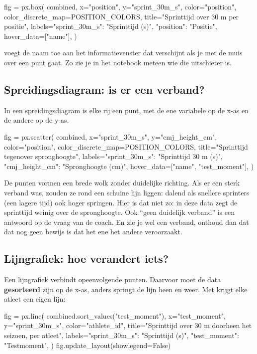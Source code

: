 \documentclass[11pt,a4paper]{article}
\begin{document}
\begin{python}[fig=boxplot]
fig = px.box(
    combined, x="position", y="sprint_30m_s",
    color="position", color_discrete_map=POSITION_COLORS,
    title="Sprinttijd over 30 m per positie",
    labels={"sprint_30m_s": "Sprinttijd (s)", "position": "Positie"},
    hover_data=["name"],
)
\end{python}

 voegt de naam toe aan het informatievenster
dat verschijnt als je met de muis over een punt gaat. Zo zie je in het
notebook meteen wie die uitschieter is.

\subsection{Spreidingsdiagram: is er een verband?}

In een spreidingsdiagram is elke rij een punt, met de ene variabele op de
x-as en de andere op de y-as.

\begin{python}[fig=scatter]
fig = px.scatter(
    combined, x="sprint_30m_s", y="cmj_height_cm",
    color="position", color_discrete_map=POSITION_COLORS,
    title="Sprinttijd tegenover spronghoogte",
    labels={"sprint_30m_s": "Sprinttijd 30 m (s)", "cmj_height_cm": "Spronghoogte (cm)"},
    hover_data=["name", "test_moment"],
)
\end{python}

De punten vormen een brede wolk zonder duidelijke richting. Als er een
sterk verband was, zouden ze rond een schuine lijn liggen: dalend als
snellere sprinters (een lagere tijd) ook hoger springen. Hier is dat niet
zo: in deze data zegt de sprinttijd weinig over de spronghoogte. Ook
``geen duidelijk verband'' is een antwoord op de vraag van de coach. En
zie je wel een verband, onthoud dan dat dat nog geen bewijs is dat het
ene het andere veroorzaakt.

\subsection{Lijngrafiek: hoe verandert iets?}

Een lijngrafiek verbindt opeenvolgende punten. Daarvoor moet de data
\textbf{gesorteerd} zijn op de x-as, anders springt de lijn heen en weer.
Met  krijgt elke atleet een eigen lijn:

\begin{python}[fig=lijn]
fig = px.line(
    combined.sort_values("test_moment"), x="test_moment", y="sprint_30m_s",
    color="athlete_id",
    title="Sprinttijd over 30 m doorheen het seizoen, per atleet",
    labels={"sprint_30m_s": "Sprinttijd (s)", "test_moment": "Testmoment"},
)
fig.update_layout(showlegend=False)
\end{python}
\end{document}
